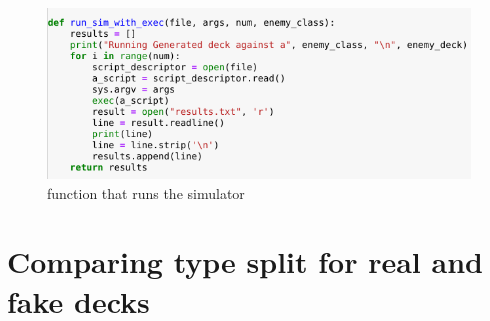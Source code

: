 \documentclass{report} %
\begin{document}
\begin{figure}[H]
\centering
\includegraphics[width=1\textwidth]{simExec}
\caption{function that runs the simulator\protect}
 \label{board}
\end{figure}

\section{Comparing type split for real and fake decks}
\end{document}
